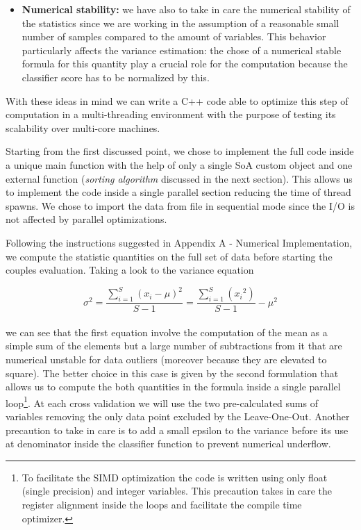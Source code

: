 \documentclass{standalone}
\begin{document}
\begin{itemize}
\item \textbf{Numerical stability:} we have also to take in care the numerical stability of the statistics since we are working in the assumption of a reasonable small number of samples compared to the amount of variables.
This behavior particularly affects the variance estimation: the chose of a numerical stable formula for this quantity play a crucial role for the computation because the classifier score has to be normalized by this.

\end{itemize}

With these ideas in mind we can write a \textsf{C++} code able to optimize this step of computation in a multi-threading environment with the purpose of testing its scalability over multi-core machines.

Starting from the first discussed point, we chose to implement the full code inside a unique main function with the help of only a single SoA custom object and one external function (\emph{sorting algorithm} discussed in the next section).
This allows us to implement the code inside a single parallel section reducing the time of thread spawns.
We chose to import the data from file in sequential mode since the I/O is not affected by parallel optimizations.

Following the instructions suggested in Appendix A - Numerical Implementation, we compute the statistic quantities on the full set of data before starting the couples evaluation.
Taking a look to the variance equation

$$
\sigma^2 = \frac{\sum_{i=1}^{S}(x_i - \mu)^2} {S - 1} = \frac{\sum_{i=1}^{S}({x_i}^2)} {S - 1} - \mu^2
$$
\\
we can see that the first equation involve the computation of the mean as a simple sum of the elements but a large number of subtractions from it that are numerical unstable for data outliers (moreover because they are elevated to square).
The better choice in this case is given by the second formulation that allows us to compute the both quantities in the formula inside a single parallel loop\footnote{
  To facilitate the SIMD optimization the code is written using only float (single precision) and integer variables.
  This precaution takes in care the register alignment inside the loops and facilitate the compile time optimizer.
}.
At each cross validation we will use the two pre-calculated sums of variables removing the only data point excluded by the Leave-One-Out.
Another precaution to take in care is to add a small epsilon to the variance before its use at denominator inside the classifier function to prevent numerical underflow.
\end{document}
